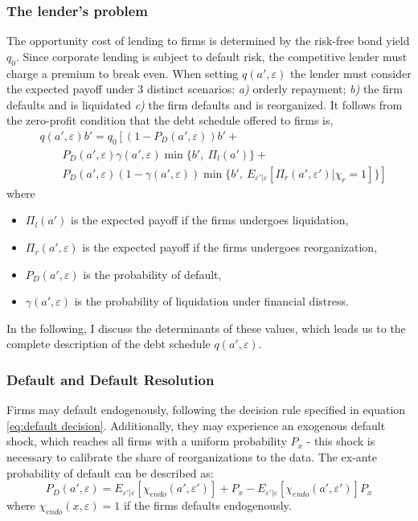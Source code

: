 \documentclass[12pt]{article}
\begin{document}
\subsubsection{The lender's problem}    \label{sec: The lender's problem}
The opportunity cost of lending to firms is determined by the risk-free bond yield $q_0$. Since corporate lending is subject to default risk, the competitive lender must charge a premium to break even. When setting $q(a',\varepsilon)$ the lender must consider the expected payoff under 3 distinct scenarios: \textit{a)} orderly repayment; \textit{b)} the firm defaults and is liquidated \textit{c)} the firm defaults and is reorganized. It follows from the zero-profit condition that the debt schedule offered to firms is, 
\begin{equation} \label{eq:q}
    \begin{split}
        & q(a', \varepsilon)b' = q_0 \left[ \left(1-P_D(a', \varepsilon)\right)b' + \right. \\
        & \qquad P_D(a', \varepsilon) \gamma(a', \varepsilon) \min \{b', \ \Pi_{l}(a')\} + \\ 
        & \qquad \left. P_D(a', \varepsilon) (1-\gamma(a', \varepsilon))\min \{b', \ E_{\varepsilon' | \varepsilon} [ \Pi_{r}(a', \varepsilon') |\chi_r = 1 ] \} \right]
    \end{split}
\end{equation}
where 
\begin{itemize}\setlength\itemsep{0em} 
    \item $\Pi_{l}(a')$ is the expected payoff if the firms undergoes liquidation,
    \item $\Pi_{r}(a', \varepsilon)$ is the expected payoff if the firms undergoes reorganization,
    \item $P_D(a', \varepsilon)$ is the probability of default,
    \item $\gamma(a', \varepsilon)$ is the probability of liquidation under financial distress. 
\end{itemize} 
In the following, I discuss the determinants of these values, which leads us to the complete description of the debt schedule $q(a', \varepsilon)$.


\subsubsection{Default and Default Resolution} \label{sec:default resolution}
Firms may default endogenously, following the decision rule specified in equation \ref{eq:default decision}. Additionally, they may experience an exogenous default shock, which reaches all firms with a uniform probability $P_{x}$ - this shock is necessary to calibrate the share of reorganizations to the data. The ex-ante probability of default can be described as: 
\begin{equation} \label{eq:default probability}
 P_D(a', \varepsilon) = E_{\varepsilon'|\varepsilon}[\chi_{endo}(a',\varepsilon')] + P_{x} - E_{\varepsilon'|\varepsilon}[\chi_{endo}(a',\varepsilon')]P_{x}
\end{equation}
where $\chi_{endo}(x, \varepsilon) = 1$ if the firms defaults endogenously. 
 
\end{document}
